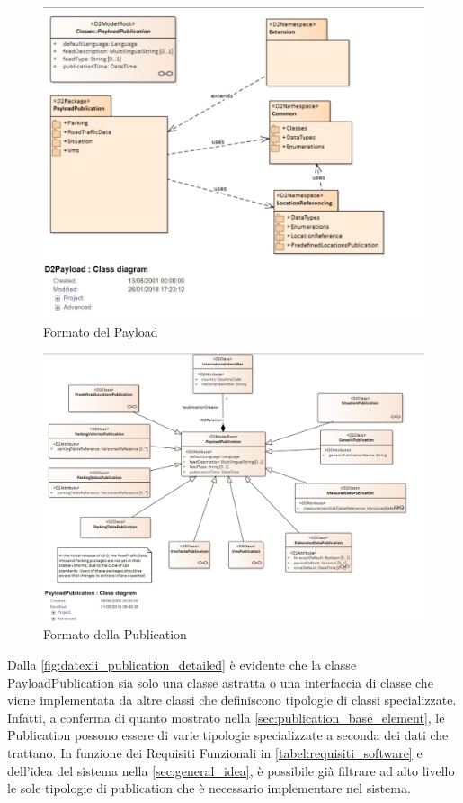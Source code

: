 \begin{figure}
	\begin{center}
		\includegraphics[width=0.6\columnwidth]{images/datexii_publication}
	\end{center}
	\caption{Formato del Payload}
	\label{fig:datexii_publication}
\end{figure}
\begin{figure}
	\begin{center}
		\includegraphics[width=0.75\columnwidth]{images/datexii_publication_detailed}
	\end{center}
	\caption{Formato della Publication}
	\label{fig:datexii_publication_detailed}
\end{figure}
Dalla \autoref{fig:datexii_publication_detailed} è evidente che la classe PayloadPublication sia solo una classe astratta o una interfaccia di classe che viene implementata da altre classi che definiscono tipologie di classi specializzate. Infatti, a conferma di quanto mostrato nella \autoref{sec:publication_base_element}, le Publication possono essere di varie tipologie specializzate a seconda dei dati che trattano.
In funzione dei Requisiti Funzionali in \autoref{tabel:requisiti_software} e dell'idea del sistema nella \autoref{sec:general_idea}, è possibile già filtrare ad alto livello le sole tipologie di publication che è necessario implementare nel sistema.
